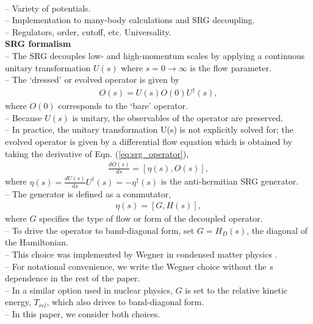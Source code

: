 \documentclass[preprintnumbers,floatfix,aps,prc,preprint,nofootinbib]{revtex4-1}
\begin{document}
\\
-- Variety of potentials.
\\
-- Implementation to many-body calculations and SRG decoupling.
\\
-- Regulators, order, cutoff, etc. Universality.
\\
\textbf{SRG formalism}
\\
-- The SRG decouples low- and high-momentum scales by applying a continuous unitary transformation $U(s)$ where $s=0 \rightarrow \infty$ is the flow parameter.
\\
-- The `dressed' or evolved operator is given by
%
\begin{eqnarray}
	\label{eq:srg_operator}
	O(s) = U(s) O(0) U^{\dagger}(s),
\end{eqnarray}
%
where $O(0)$ corresponds to the `bare' operator.
\\
-- Because $U(s)$ is unitary, the observables of the operator are preserved.
\\
-- In practice, the unitary transformation U(s) is not explicitly solved for; the evolved operator is given by a differential flow equation which is obtained by taking the derivative of Eqn. (\ref{eq:srg_operator}),
%
\begin{eqnarray}
	\label{eq:srg_flow}
	\frac{dO(s)}{ds} = [\eta(s), O(s)],
\end{eqnarray}
%
where $\eta(s)=\frac{dU(s)}{ds} U^{\dagger}(s) = -\eta^{\dagger}(s)$ is the anti-hermitian SRG generator.
\\
-- The generator is defined as a commutator,
%
\begin{eqnarray}
	\label{eq:srg_generator}
	\eta(s) = [G, H(s)],
\end{eqnarray}
%
where $G$ specifies the type of flow or form of the decoupled operator.
\\
-- To drive the operator to band-diagonal form, set $G=H_D(s)$, the diagonal of the Hamiltonian.
\\
-- This choice was implemented by Wegner in condensed matter physics \cite{Wegner:1994ab}.
\\
-- For notational convenience, we write the Wegner choice without the $s$ dependence in the rest of the paper.
\\
-- In a similar option used in nuclear physics, $G$ is set to the relative kinetic energy, $T_{rel}$, which also drives to band-diagonal form.
\\
-- In this paper, we consider both choices.
\end{document}
